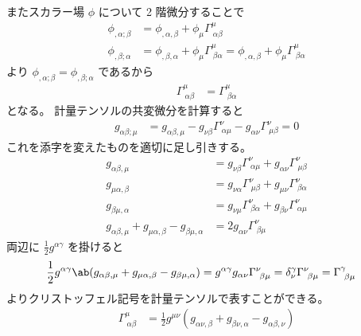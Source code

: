 \documentclass[uplatex,dvipdfmx,a4paper,11pt]{jlreq}
\theoremstyle{definition}
\begin{document}
またスカラー場 $\phi$ について 2 階微分することで
\begin{align}
  \phi_{,\alpha;\beta} & = \phi_{,\alpha,\beta} + \phi_\mu\Gamma^\mu_{\ \alpha\beta}                                                             \\
  \phi_{,\beta;\alpha} & = \phi_{,\beta,\alpha} + \phi_\mu\Gamma^\mu_{\ \beta\alpha} = \phi_{,\alpha,\beta} + \phi_\mu\Gamma^\mu_{\ \beta\alpha}
\end{align}
より $\phi_{,\alpha;\beta} = \phi_{,\beta;\alpha}$ であるから
\begin{align}
  \Gamma^\mu_{\ \alpha\beta} & = \Gamma^\mu_{\ \beta\alpha}
\end{align}
となる。
計量テンソルの共変微分を計算すると
\begin{align}
  g_{\alpha\beta;\mu} & = g_{\alpha\beta,\mu} - g_{\nu\beta}\Gamma^\nu_{\ \alpha\mu} - g_{\alpha\nu}\Gamma^\nu_{\ \mu\beta} = 0
\end{align}
これを添字を変えたものを適切に足し引きする。
\begin{align}
  g_{\alpha\beta,\mu}                                             & = g_{\nu\beta}\Gamma^\nu_{\ \alpha\mu} + g_{\alpha\nu}\Gamma^\nu_{\ \mu\beta} \\
  g_{\mu\alpha,\beta}                                             & = g_{\nu\alpha}\Gamma^\nu_{\ \mu\beta} + g_{\mu\nu}\Gamma^\nu_{\ \beta\alpha} \\
  g_{\beta\mu,\alpha}                                             & = g_{\nu\mu}\Gamma^\nu_{\ \beta\alpha} + g_{\beta\nu}\Gamma^\nu_{\ \alpha\mu} \\
  g_{\alpha\beta,\mu} + g_{\mu\alpha,\beta} - g_{\beta\mu,\alpha} & = 2g_{\alpha\nu}\Gamma^\nu_{\ \beta\mu}
\end{align}
両辺に $\frac{1}{2}g^{\alpha\gamma}$ を掛けると
\begin{align}
  \frac{1}{2}g^{\alpha\gamma}\ab(g_{\alpha\beta,\mu} + g_{\mu\alpha,\beta} - g_{\beta\mu,\alpha}) & = g^{\alpha\gamma}g_{\alpha\nu}\Gamma^\nu_{\ \beta\mu} = \delta_{\nu}^\gamma\Gamma^\nu_{\ \beta\mu} = \Gamma^\gamma_{\ \beta\mu}
\end{align}
よりクリストッフェル記号を計量テンソルで表すことができる。
\begin{align}
  \Gamma^\mu_{\ \alpha\beta} & = \frac{1}{2}g^{\mu\nu}(g_{\alpha\nu,\beta} + g_{\beta\nu,\alpha} - g_{\alpha\beta,\nu})
\end{align}
\end{document}
